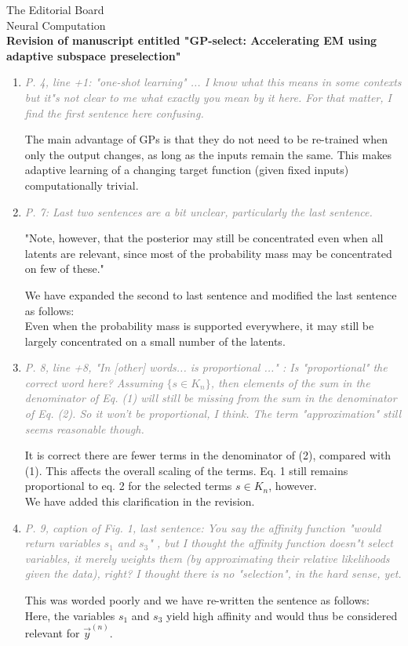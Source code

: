 \documentclass[10pt]{letter}
\newcommand{\rvr}[1]{\textcolor{gray}{#1}}
\begin{document}
\begin{letter}{
The Editorial Board\\
Neural Computation\\
\vspace{10mm}
\textbf{Revision of manuscript entitled "GP-select: Accelerating EM using adaptive
subspace preselection"}
}
\begin{enumerate}[topsep=3pt,itemsep=2ex,partopsep=1ex,parsep=1ex]
    \item \rvr{\emph{P. 4, line +1: "one-shot learning" ... I know what this means in some contexts but it"s not clear to me what exactly you mean by it here. For that matter, I find the first sentence here confusing.}}

     The main advantage of GPs is that they do not need to be re-trained when only the output changes, as long as the inputs remain the same. This makes adaptive learning of a changing target function (given fixed inputs) computationally trivial.


    \item \rvr{\emph{P. 7: Last two sentences are a bit unclear, particularly the last sentence.}}

"Note, however, that the posterior may still be concentrated even when all latents are relevant, since most of the probability mass may be concentrated on few of these."

We have expanded the second to last sentence and modified the last sentence as follows:\\
Even when the probability mass is supported everywhere, it may still be largely concentrated on a small number of the latents.

    \item \rvr{\emph{ P. 8, line +8,   "In [other] words... is proportional ..." : Is "proportional"  the correct word here? Assuming $\{ s \in K_n \}$, then elements of the sum in the denominator of Eq. (1) will still be missing from the sum in the denominator of Eq. (2). So it won't be proportional, I think. The term "approximation" still seems reasonable though.}}

It is correct there are fewer terms in the denominator of (2), compared with (1). This affects the overall scaling of the terms. Eq. 1 still remains proportional to eq. 2 for the selected terms $s\in K_n$, however. \\
We have added this clarification in the revision.

    \item \rvr{\emph{P. 9, caption of Fig. 1, last sentence: You say the affinity function "would return variables $s_1$ and $s_3$" , but I thought the affinity function doesn"t select variables, it merely weights them (by approximating their relative likelihoods given the data), right? I thought there is no "selection", in the hard sense, yet.}}

    This was worded poorly and we have re-written the sentence as follows: \\
Here, the variables $s_1$ and $s_3$ yield high affinity and would thus be considered relevant for $\vec{y}^{(n)}$.


\end{enumerate}
\end{letter}
\end{document}
